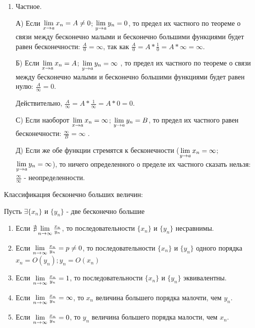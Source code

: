 \documentclass{article}
\begin{document}
\begin{enumerate}
	\item Частное.

	      А) Если $\lim\limits_{x \to a}x_n=A\neq 0$; $\lim\limits_{y \to a}y_n=0$, то предел их частного по теореме о связи между бесконечно малыми и бесконечно большими функциями будет равен бесконечности: $\frac{A}{0}=\infty$, так как  $\frac{A}{0}=A*\frac{1}{0}=A*\infty=\infty$.

	      Б) Если $\lim\limits_{x \to a}x_n=A$; $\lim\limits_{y \to a}y_n=\infty$ , то предел их частного по теореме о связи между бесконечно малыми и бесконечно большими функциями будет равен нулю: $\frac{A}{\infty}=0$.

	      Действительно, $\frac{A}{\infty}=A*\frac{1}{\infty}=A*0=0$.

	      С) Если наоборот  $\lim\limits_{x \to a}x_n=\infty$; $\lim\limits_{y \to a}y_n=B$, то предел их частного равен бесконечности: $\frac{\infty}B=\infty$ .

	      Д) Если же обе функции стремятся к  бесконечности ($\lim\limits_{y \to a}x_n=\infty$;$\lim\limits_{y \to a}y_n=\infty$), то ничего определенного о пределе их частного сказать нельзя: $\frac{\infty}\infty$ - неопределенности.
\end{enumerate}


Классификация бесконечно больших величин:

Пусть $\exists \{x_n\}$ и $\{y_n\}$ - две бесконечно большие
\begin{enumerate}
	\item{}Если $\nexists \lim\limits_{n \to \infty}\frac{x_n}{y_n}$, то последовательности $\{x_n\}$ и $\{y_n\}$ несравнимы.
	\item{}Если $\lim\limits_{n \to \infty}\frac{x_n}{y_n}=p\neq 0$, то последовательности $\{x_n\}$ и $\{y_n\}$ одного порядка $x_n=O(y_n);y_n=O(x_n)$
	\item{}Если $ \lim\limits_{n \to \infty}\frac{x_n}{y_n}=1$, то последовательности $\{x_n\}$ и $\{y_n\}$ эквивалентны.
	\item{}Если $ \lim\limits_{n \to \infty}\frac{x_n}{y_n}=\infty$, то $x_n$ величина большего порядка малочти, чем $y_n$.
	\item{}Если $ \lim\limits_{n \to \infty}\frac{x_n}{y_n}=0$, то $y_n$ величина большего порядка малости, чем $x_n$.

\end{enumerate}
\end{document}
